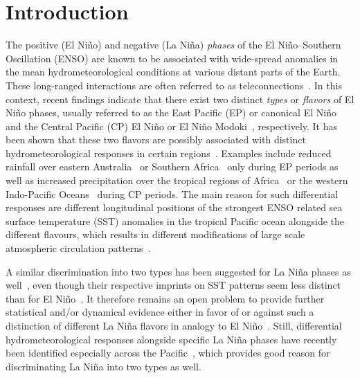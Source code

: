 \documentclass[utf8]{frontiersSCNS} %
\begin{document}
\section{Introduction}
The positive (El Ni\~no) and negative (La Ni\~na) \textit{phases} of the El Ni\~no--Southern Oscillation (ENSO) are known to be associated with wide-spread anomalies in the mean hydrometeorological conditions at various distant parts of the Earth. These long-ranged interactions are often referred to as teleconnections~\citep{trenberth_definition_1997,neelin_tropical_2003, domeisen2019teleconnection}. In this context, recent findings indicate that there exist two distinct \textit{types} or \textit{flavors} of El Ni\~no phases, usually referred to as the East Pacific (EP) or canonical El Ni\~no and the Central Pacific (CP) El Ni\~no or El Ni\~no Modoki~\citep{ashok_nino_2007,kao_contrasting_2009, marathe2015revisiting}, respectively. It has been shown that these two flavors are possibly associated with distinct hydrometeorological responses in certain regions~\citep{taschetto_nino_2009}. Examples include reduced rainfall over eastern Australia~\citep{chiew_ninosouthern_1998} or Southern Africa~\citep{ratnam2014remote} only during EP periods as well as increased precipitation over the tropical regions of Africa~\citep{preethi2015impacts} or the western Indo-Pacific Oceans~\citep{weng2011anomalous,feng2014influence} during CP periods. The main reason for such differential responses are different longitudinal positions of the strongest ENSO related sea surface temperature (SST) anomalies in the tropical Pacific ocean alongside the different flavours, which results in different modifications of large scale atmospheric circulation patterns~\citep{ashok_climate_2009, domeisen2019teleconnection}.

A similar discrimination into two types has been suggested for La Ni\~na phases as well~\citep{kug_are_2011}, even though their respective imprints on SST patterns seem less distinct than for El Ni\~no~\citep{kao_contrasting_2009, ren_nino_2011}. It therefore remains an open problem to provide further statistical and/or dynamical evidence either in favor of or against such a distinction of different La Ni\~na flavors in analogy to El Ni\~no~\citep{levine2016extreme, chen2015strong, zhang2015impacts}. Still, differential hydrometeorological responses alongside specific La Ni\~na phases have recently been identified especially across the Pacific~\citep{hidayat2018impact, magee2017influence, song2017distinct, shinoda2011anomalous}, which provides good reason for discriminating La Ni\~na into two types as well.
\end{document}
